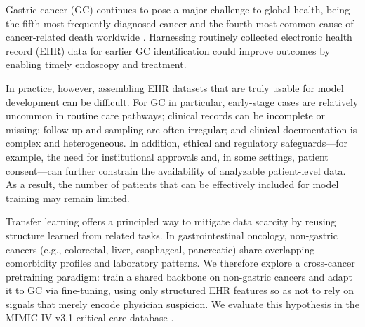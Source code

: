 \documentclass[diagnostics,article,submit,pdftex,moreauthors]{Definitions/mdpi}
\begin{document}
{\color{red}
Gastric cancer (GC) continues to pose a major challenge to global health, being the fifth most frequently diagnosed cancer and the fourth most common cause of cancer-related death worldwide \citep{sung2021global}. Harnessing routinely collected electronic health record (EHR) data for earlier GC identification could improve outcomes by enabling timely endoscopy and treatment.

In practice, however, assembling EHR datasets that are truly usable for model development can be difficult. For GC in particular, early-stage cases are relatively uncommon in routine care pathways; clinical records can be incomplete or missing; follow-up and sampling are often irregular; and clinical documentation is complex and heterogeneous. In addition, ethical and regulatory safeguards---for example, the need for institutional approvals and, in some settings, patient consent---can further constrain the availability of analyzable patient-level data. As a result, the number of patients that can be effectively included for model training may remain limited.

Transfer learning offers a principled way to mitigate data scarcity by reusing structure learned from related tasks. In gastrointestinal oncology, non-gastric cancers (e.g., colorectal, liver, esophageal, pancreatic) share overlapping comorbidity profiles and laboratory patterns. We therefore explore a cross-cancer pretraining paradigm: train a shared backbone on non-gastric cancers and adapt it to GC via fine-tuning, using only structured EHR features so as not to rely on signals that merely encode physician suspicion. We evaluate this hypothesis in the MIMIC-IV v3.1 critical care database \citep{Johnson2024MIMICIV}.
}
\end{document}
